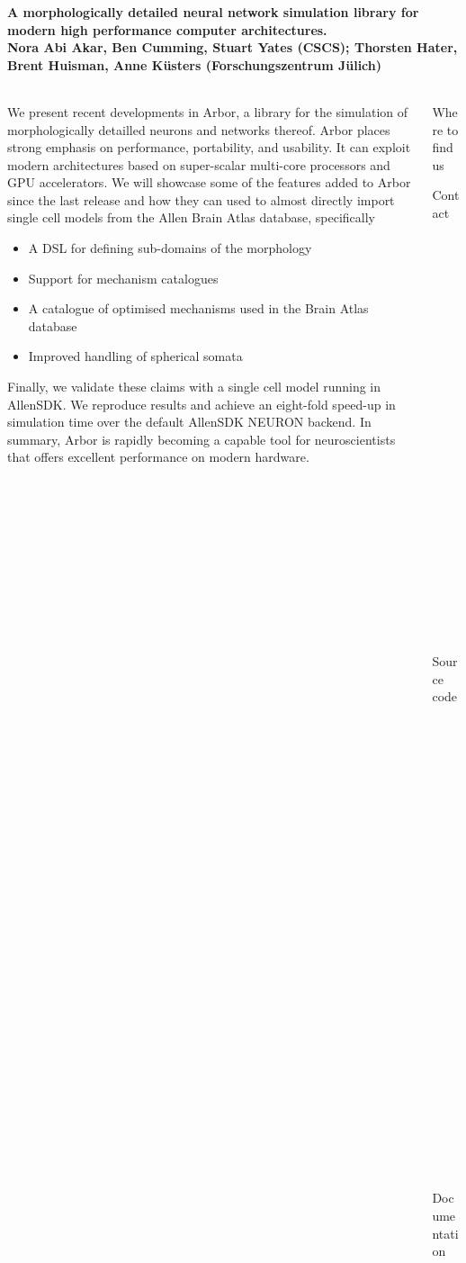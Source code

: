 \documentclass{beamer}
\begin{document}
\begin{frame}[t]
  \frametitle{}
  \framesubtitle{A morphologically detailed neural network simulation library for modern high performance computer architectures.\\
    \tiny{Nora Abi Akar, Ben Cumming, Stuart Yates (CSCS); Thorsten Hater, Brent Huisman, Anne Küsters (Forschungszentrum Jülich)}}

  \begin{columns}
    \begin{column}{0.65\textwidth}
  We present recent developments in Arbor, a library for the simulation of
  morphologically detailled neurons and networks thereof. Arbor places strong
  emphasis on performance, portability, and usability. It can exploit modern
  architectures based on super-scalar multi-core processors and GPU accelerators.
  We will showcase some of the features added to Arbor since the last release and
  how they can used to almost directly import single cell models from the Allen
  Brain Atlas database, specifically

  \begin{itemize}
    \item A DSL for defining sub-domains of the morphology
    \item Support for mechanism catalogues
    \item A catalogue of optimised mechanisms used in the Brain Atlas database
    \item Improved handling of spherical somata
  \end{itemize}

  Finally, we validate these claims with a single cell model running in AllenSDK\@.
  We reproduce results and achieve an eight-fold speed-up in simulation time over
  the default AllenSDK NEURON backend.
  In summary, Arbor is rapidly becoming a capable tool for neuroscientists that
  offers excellent performance on modern hardware.
\end{column}
\begin{column}{0.3\textwidth}
  \begin{block}{Where to find us}
  \begin{description}
    \item[Contact] arbor-sim@fz-juelich.de
    \item[Source code] github.com/arbor-sim/arbor
    \item[Documentation] arbor.readthedocs.io
  \end{description}
\end{block}
\end{column}
\end{columns}



\end{frame}
\end{document}
